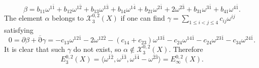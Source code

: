 \documentclass[a4paper]{amsart}
\theoremstyle{definition}
\theoremstyle{remark}
\newtheorem{remark}[theorem]{Remark}
\newcommand{\db}{\operatorname{\overline{\partial}}}
\numberwithin{equation}{section}
\begin{document}
$$\beta=b_{11}\omega^{1\bar1}+b_{12}\omega^{1\bar2}+b_{13}\omega^{1\bar3}
+b_{14}\omega^{1\bar4}+b_{21}\omega^{2\bar1}+2\omega^{2\bar3}
+b_{31}\omega^{3\bar1}+b_{41}\omega^{4\bar1}.$$
The element $\alpha$ belongs to $\mathcal X^{0,2}_3(X)$ if one can find $\gamma=\sum_{1\leq i<j\leq 4}c_{ij}\omega^{ij}$ satisfying
$$0=\partial\beta+\db\gamma=-c_{13}\omega^{12\bar1}-2\omega^{12\bar2}-(c_{14}+c_{23})\omega^{13\bar1}-c_{24}\omega^{14\bar1}-c_{24}\omega^{23\bar1}-c_{34}\omega^{24\bar1}.$$
It is clear that such $\gamma$ do not exist, so $\alpha\notin\mathcal X^{0,2}_3(X)$. Therefore
$$E_3^{0,2}(X)=\langle \omega^{\bar1\bar2},\omega^{\bar1\bar3}, \omega^{\bar1\bar4}-\omega^{\bar2\bar3}\rangle=E_{\infty}^{0,2}(X).$$




\end{document}
